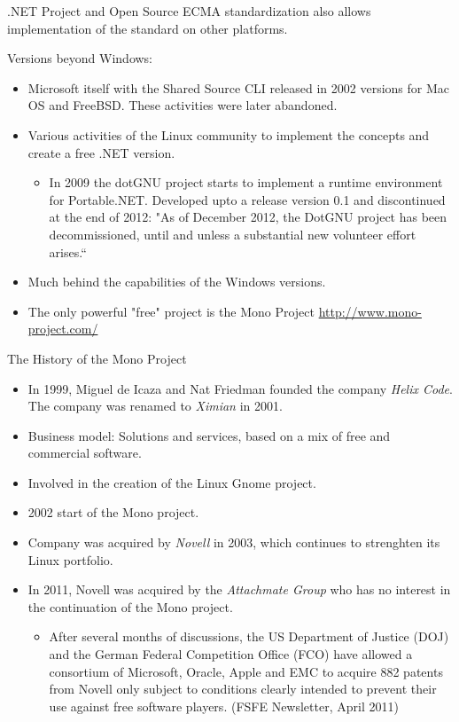 \documentclass{beamer}
\begin{document}
\begin{frame}{.NET Project and Open Source}
ECMA standardization also allows implementation of the standard
on other platforms.

Versions beyond Windows:
\begin{itemize}
\item Microsoft itself with the Shared Source CLI released in 2002 versions
  for Mac OS and FreeBSD. These activities were later abandoned.
\item Various activities of the Linux community to implement the concepts and
  create a free .NET version.
  \begin{itemize}
  \item In 2009 the dotGNU project starts to implement a runtime environment
    for Portable.NET. Developed upto a release version 0.1 and discontinued at
    the end of 2012: "As of December 2012, the DotGNU project has been
    decommissioned, until and unless a substantial new volunteer effort
    arises.“
  \end{itemize}
\item Much behind the capabilities of the Windows versions.
\item The only powerful "free" project is the Mono Project
  \url{http://www.mono-project.com/}
\end{itemize}
\end{frame}

\begin{frame}{The History of the Mono Project}
\begin{itemize}
\item In 1999, Miguel de Icaza and Nat Friedman founded the company
  \emph{Helix Code}.  The company was renamed to \emph{Ximian} in 2001.
\item Business model: Solutions and services, based on a mix of free and
  commercial software.
\item Involved in the creation of the Linux Gnome project.
\item 2002 start of the Mono project.
\item Company was acquired by \emph{Novell} in 2003, which continues to
  strenghten its Linux portfolio.
\item In 2011, Novell was acquired by the \emph{Attachmate Group} who has no
  interest in the continuation of the Mono project.
  \begin{itemize}
  \item After several months of discussions, the US Department of Justice
    (DOJ) and the German Federal Competition Office (FCO) have allowed a
    consortium of Microsoft, Oracle, Apple and EMC to acquire 882 patents from
    Novell only subject to conditions clearly intended to prevent their use
    against free software players.  (FSFE Newsletter, April 2011)
  \end{itemize}
\end{itemize}
\end{frame}
\end{document}
